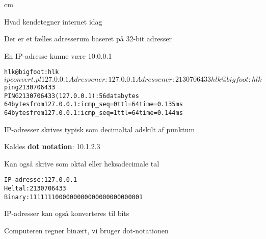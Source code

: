 

 cm

\begin{list1}
\item Hvad kendetegner internet idag
\item Der er et fælles adresserum baseret på 32-bit adresser
\item En IP-adresse kunne være 10.0.0.1
\end{list1}


\begin{alltt}
hlk@bigfoot:hlk$ ipconvert.pl 127.0.0.1
Adressen er: 127.0.0.1
Adressen er: 2130706433
hlk@bigfoot:hlk$ ping 2130706433
PING 2130706433 (127.0.0.1): 56 data bytes
64 bytes from 127.0.0.1: icmp_seq=0 ttl=64 time=0.135 ms
64 bytes from 127.0.0.1: icmp_seq=1 ttl=64 time=0.144 ms
\end{alltt}

\begin{list1}
\item IP-adresser skrives typisk som decimaltal adskilt af punktum
\item Kaldes {\bf dot notation}: 10.1.2.3
\item Kan også skrive som oktal eller heksadecimale tal
\end{list1}




\begin{alltt}
IP-adresse: 127.0.0.1
Heltal:	2130706433
Binary:	1111111000000000000000000000001
\end{alltt}

\begin{list1}
\item IP-adresser kan også konverteres til bits
\item Computeren regner binært, vi bruger dot-notationen
\end{list1}


